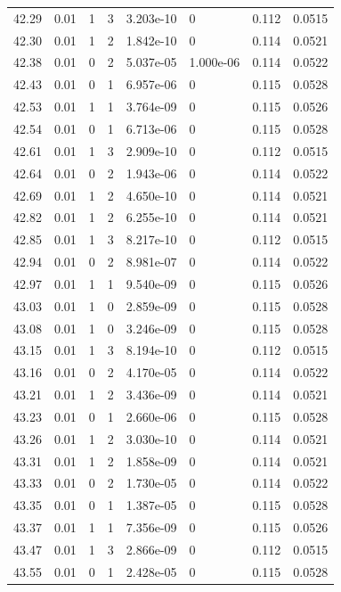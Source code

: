 \documentclass[preview]{standalone}
\begin{document}
{{{{{{{{{{{{{{{{{{\begin{tabular}{L{1.2cm}C{1.2cm} C{0.3cm}C{0.5cm} C{1.4cm}C{1.4cm} C{1.4cm}C{1.4cm}}
  42.29  &  0.01  & 1     &  3 &  3.203e-10  & 0  & 0.112 &  0.0515   \\ 
  42.30  &  0.01  & 1     &  2 &  1.842e-10  & 0  & 0.114 &  0.0521   \\ 
  42.38  &  0.01  & 0     &  2 &  5.037e-05  & 1.000e-06  & 0.114 &  0.0522   \\ 
  42.43  &  0.01  & 0     &  1 &  6.957e-06  & 0  & 0.115 &  0.0528   \\ 
  42.53  &  0.01  & 1     &  1 &  3.764e-09  & 0  & 0.115 &  0.0526   \\ 
  42.54  &  0.01  & 0     &  1 &  6.713e-06  & 0  & 0.115 &  0.0528   \\ 
  42.61  &  0.01  & 1     &  3 &  2.909e-10  & 0  & 0.112 &  0.0515   \\ 
  42.64  &  0.01  & 0     &  2 &  1.943e-06  & 0  & 0.114 &  0.0522   \\ 
  42.69  &  0.01  & 1     &  2 &  4.650e-10  & 0  & 0.114 &  0.0521   \\ 
  42.82  &  0.01  & 1     &  2 &  6.255e-10  & 0  & 0.114 &  0.0521   \\ 
  42.85  &  0.01  & 1     &  3 &  8.217e-10  & 0  & 0.112 &  0.0515   \\ 
  42.94  &  0.01  & 0     &  2 &  8.981e-07  & 0  & 0.114 &  0.0522   \\ 
  42.97  &  0.01  & 1     &  1 &  9.540e-09  & 0  & 0.115 &  0.0526   \\ 
  43.03  &  0.01  & 1     &  0 &  2.859e-09  & 0  & 0.115 &  0.0528   \\ 
  43.08  &  0.01  & 1     &  0 &  3.246e-09  & 0  & 0.115 &  0.0528   \\ 
  43.15  &  0.01  & 1     &  3 &  8.194e-10  & 0  & 0.112 &  0.0515   \\ 
  43.16  &  0.01  & 0     &  2 &  4.170e-05  & 0  & 0.114 &  0.0522   \\ 
  43.21  &  0.01  & 1     &  2 &  3.436e-09  & 0  & 0.114 &  0.0521   \\ 
  43.23  &  0.01  & 0     &  1 &  2.660e-06  & 0  & 0.115 &  0.0528   \\ 
  43.26  &  0.01  & 1     &  2 &  3.030e-10  & 0  & 0.114 &  0.0521   \\ 
  43.31  &  0.01  & 1     &  2 &  1.858e-09  & 0  & 0.114 &  0.0521   \\ 
  43.33  &  0.01  & 0     &  2 &  1.730e-05  & 0  & 0.114 &  0.0522   \\ 
  43.35  &  0.01  & 0     &  1 &  1.387e-05  & 0  & 0.115 &  0.0528   \\ 
  43.37  &  0.01  & 1     &  1 &  7.356e-09  & 0  & 0.115 &  0.0526   \\ 
  43.47  &  0.01  & 1     &  3 &  2.866e-09  & 0  & 0.112 &  0.0515   \\ 
  43.55  &  0.01  & 0     &  1 &  2.428e-05  & 0  & 0.115 &  0.0528   \\ 
\hline 
\end{tabular} 

}}}}}}}}}}}}}}}}}}
\end{document}
